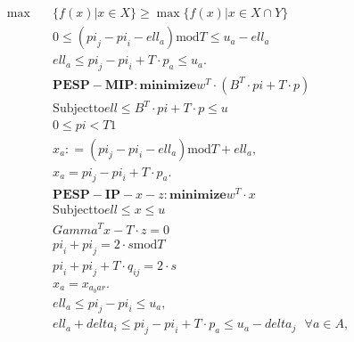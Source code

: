 \begin{align}
  \max\quad & \{ f(x) | x \in X \} \geq \max \{ f(x) | x \in X \cap Y \} \tag{eq\_0001} \\
  & 0 \leq \left(\mathit{pi}_{j} - \mathit{pi}_{i} - \mathit{ell}_{a}\right) \text{mod} T \leq u_{a} - \mathit{ell}_{a} \tag{eq\_0002} \\
  & \mathit{ell}_{a} \leq \mathit{pi}_{j} - \mathit{pi}_{i} + T \cdot p_{a} \leq u_{a} . \tag{eq\_0004} \\
  & \mathbf{PESP} - \mathbf{MIP:} \mathbf{minimize} w^{T} \cdot \left(B^{T} \cdot \mathit{pi} + T \cdot p\right) \tag{eq\_0005} \\
  & \text{Subject} \text{to} \mathit{ell} \leq B^{T} \cdot \mathit{pi} + T \cdot p \leq u \tag{eq\_0006} \\
  & 0 \leq \mathit{pi} < T 1 \tag{eq\_0007} \\
  & x_{a} : = \left(\mathit{pi}_{j} - \mathit{pi}_{i} - \mathit{ell}_{a}\right) \text{mod} T + \mathit{ell}_{a} , \tag{eq\_0009} \\
  & x_{a} = \mathit{pi}_{j} - \mathit{pi}_{i} + T \cdot p_{a} . \tag{eq\_0010} \\
  & \mathbf{PESP} - \mathbf{IP} - x - z \mathbf{:} \mathbf{minimize} w^{T} \cdot x \tag{eq\_0011} \\
  & \text{Subject} \text{to} \mathit{ell} \leq x \leq u \tag{eq\_0012} \\
  & \mathit{Gamma}^{T} x - T \cdot z = 0 \tag{eq\_0013} \\
  & \mathit{pi}_{i} + \mathit{pi}_{j} = 2 \cdot s \text{mod} T \tag{eq\_0016} \\
  & \mathit{pi}_{i} + \mathit{pi}_{j} + T \cdot q_{i j} = 2 \cdot s \tag{eq\_0017} \\
  & x_{a} = x_{a_bar} . \tag{eq\_0018} \\
  & \mathit{ell}_{a} \leq \mathit{pi}_{j} - \mathit{pi}_{i} \leq u_{a} , \tag{eq\_0019} \\
  & \mathit{ell}_{a} + \mathit{delta}_{i} \leq \mathit{pi}_{j} - \mathit{pi}_{i} + T \cdot p_{a} \leq u_{a} - \mathit{delta}_{j} \textrm{ } \forall a \in A , \tag{eq\_0020} \\
\end{align}
